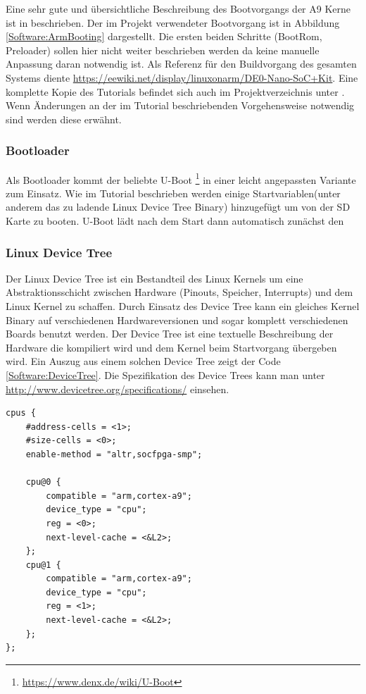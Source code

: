 Eine sehr gute und übersichtliche Beschreibung des Bootvorgangs der A9 Kerne ist in \cite{arm_booting} beschrieben. Der im \Projectname Projekt verwendeter Bootvorgang ist in Abbildung \ref{Software:ArmBooting} dargestellt. Die ersten beiden Schritte (BootRom, Preloader) sollen hier nicht weiter beschrieben werden da keine manuelle Anpassung daran notwendig ist. Als Referenz für den Buildvorgang des gesamten Systems diente \href{https://eewiki.net/display/linuxonarm/DE0-Nano-SoC+Kit}{https://eewiki.net/display/linuxonarm/DE0-Nano-SoC+Kit}. Eine komplette Kopie des Tutorials befindet sich auch im Projektverzeichnis unter . Wenn Änderungen an der im Tutorial beschriebenden Vorgehensweise notwendig sind werden diese erwähnt.

\subsubsection{Bootloader}
Als Bootloader kommt der beliebte U-Boot \footnote{\href{https://www.denx.de/wiki/U-Boot}{https://www.denx.de/wiki/U-Boot}} in einer leicht angepassten Variante zum Einsatz. Wie im Tutorial beschrieben werden einige Startvariablen(unter anderem das zu ladende Linux Device Tree Binary) hinzugefügt um von der SD Karte zu booten. U-Boot lädt nach dem Start dann automatisch zunächst den

\subsubsection{Linux Device Tree} 
Der Linux Device Tree ist ein Bestandteil des Linux Kernels um eine Abstraktionsschicht zwischen Hardware (Pinouts, Speicher, Interrupts) und dem Linux Kernel zu schaffen. Durch Einsatz des Device Tree kann ein gleiches Kernel Binary auf verschiedenen Hardwareversionen und sogar komplett verschiedenen Boards benutzt werden. Der Device Tree ist eine textuelle Beschreibung der Hardware die kompiliert wird und dem Kernel beim Startvorgang übergeben wird. Ein Auszug aus einem solchen Device Tree zeigt der Code \ref{Software:DeviceTree}. Die Spezifikation des Device Trees kann man unter \href{http://www.devicetree.org/specifications/}{http://www.devicetree.org/specifications/} einsehen.

\begin{lstlisting}[caption={[Auszug aus socfpga.dtsi]Auszug aus socfpga.dtsi \cite[Version~4.7, \texttt{arch/arm/boot/dts/socfpga.dtsi}]{Linux_Kernel}}, label=Software:DeviceTree]
cpus {
	#address-cells = <1>;
	#size-cells = <0>;
	enable-method = "altr,socfpga-smp";

	cpu@0 {
		compatible = "arm,cortex-a9";
		device_type = "cpu";
		reg = <0>;
		next-level-cache = <&L2>;
	};
	cpu@1 {
		compatible = "arm,cortex-a9";
		device_type = "cpu";
		reg = <1>;
		next-level-cache = <&L2>;
	};
};
\end{lstlisting}

